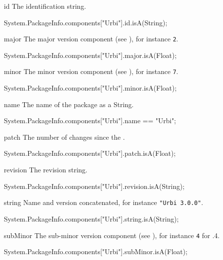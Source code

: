 \begin{urbiscriptapi}
\item[id] The identification string.
\begin{urbiassert}
System.PackageInfo.components["Urbi"].id.isA(String);
\end{urbiassert}


\item[major] The major version component (see ), for
  instance \lstinline|2|.
\begin{urbiassert}
System.PackageInfo.components["Urbi"].major.isA(Float);
\end{urbiassert}


\item[minor] The minor version component (see ), for
  instance \lstinline|7|.
\begin{urbiassert}
System.PackageInfo.components["Urbi"].minor.isA(Float);
\end{urbiassert}


\item[name] The name of the package as a String.
\begin{urbiassert}
System.PackageInfo.components["Urbi"].name
  == "Urbi";
\end{urbiassert}


\item[patch] The number of changes since the .
\begin{urbiassert}
System.PackageInfo.components["Urbi"].patch.isA(Float);
\end{urbiassert}


\item[revision] The revision string.
\begin{urbiassert}
System.PackageInfo.components["Urbi"].revision.isA(String);
\end{urbiassert}


\item[string] Name and version concatenated, for instance
  \lstinline|"Urbi 3.0.0"|.
\begin{urbiassert}
System.PackageInfo.components["Urbi"].string.isA(String);
\end{urbiassert}


\item[subMinor] The sub-minor version component (see ), for
  instance \lstinline|4| for .4.
\begin{urbiassert}
System.PackageInfo.components["Urbi"].subMinor.isA(Float);
\end{urbiassert}



\end{urbiscriptapi}

